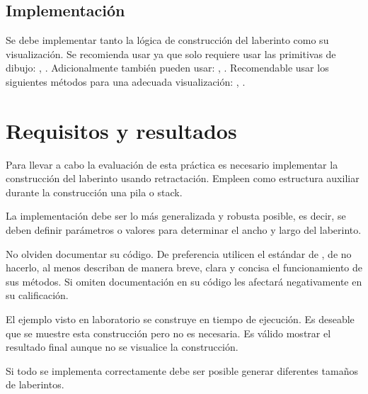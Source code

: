\subsection{Implementaci\'on}

Se debe implementar tanto la lógica de construcción del laberinto como su visualización. Se recomienda usar  ya que solo requiere usar las primitivas de dibujo: , . Adicionalmente también pueden usar: , . Recomendable usar los siguientes métodos para una adecuada visualización: , .



\section{Requisitos y resultados}

Para llevar a cabo la evaluación de esta práctica es necesario implementar la construcción del laberinto usando retractación. Empleen como estructura auxiliar durante la construcción una pila o stack.

La implementación debe ser lo más generalizada y robusta posible, es decir, se deben definir parámetros o valores para determinar el ancho y largo del laberinto.

No olviden documentar su código. De preferencia utilicen el estándar de , de no hacerlo, al menos describan de manera breve, clara y concisa el funcionamiento de sus métodos. Si omiten documentación en su código les afectará negativamente en su calificación.

El ejemplo visto en laboratorio se construye en tiempo de ejecución. Es deseable que se muestre esta construcción pero no es necesaria. Es válido mostrar el resultado final aunque no se visualice la construcción.

Si todo se implementa correctamente debe ser posible generar diferentes tamaños de laberintos.




